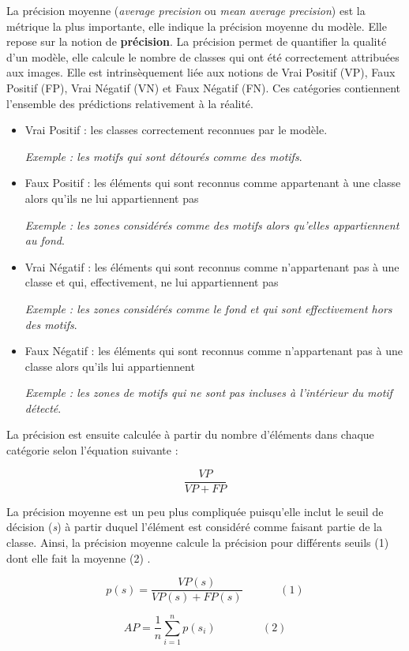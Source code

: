 \documentclass[a4paper, twoside, 12pt]{book}
\begin{document}
La précision moyenne (\textit{average precision} ou \textit{mean average precision}) est la métrique la plus importante, elle indique la précision moyenne du modèle. Elle repose sur la notion de \textbf{précision}. La précision permet de quantifier la qualité d'un modèle, elle calcule le nombre de classes qui ont été correctement attribuées aux images. Elle est intrinsèquement liée aux notions de Vrai Positif (VP), Faux Positif (FP), Vrai Négatif (VN) et Faux Négatif (FN). Ces catégories contiennent l'ensemble des prédictions relativement à la réalité. 
\begin{itemize}
    \item Vrai Positif : les classes correctement reconnues par le modèle. 
    
    \textit{Exemple : les motifs qui sont détourés comme des motifs}.
    \item Faux Positif : les éléments qui sont reconnus comme appartenant à une classe alors qu'ils ne lui appartiennent pas 
    
    \textit{Exemple : les zones considérés comme des motifs alors qu'elles appartiennent au fond}.
    \item Vrai Négatif : les éléments qui sont reconnus comme n'appartenant pas à une classe et qui, effectivement, ne lui appartiennent pas 
    
    \textit{Exemple : les zones considérés comme le fond et qui sont effectivement hors des motifs}.
    \item Faux Négatif : les éléments qui sont reconnus comme n'appartenant pas à une classe alors qu'ils lui appartiennent 
    
    \textit{Exemple : les zones de motifs qui ne sont pas incluses à l'intérieur du motif détecté}.
\end{itemize}

La précision est ensuite calculée à partir du nombre d'éléments dans chaque catégorie selon l'équation suivante : 

\[\frac{VP}{VP+FP}\]

La précision moyenne est un peu plus compliquée puisqu'elle inclut le seuil de décision (\textit{s}) à partir duquel l'élément est considéré comme faisant partie de la classe. Ainsi, la précision moyenne calcule la précision pour différents seuils (1) dont elle fait la moyenne (2) . 

\[p(s) = \frac{VP(s)}{VP(s)+FP(s)} \hspace{40pt} (1)\] 

\[AP = \frac{1}{n} \sum_{i=1}^n p(s_i) \hspace{50pt} (2)\]
\end{document}
